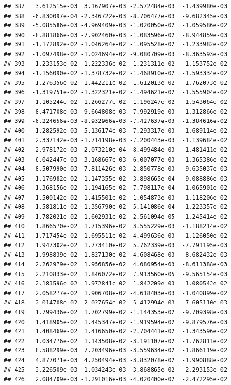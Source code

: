 \documentclass[
]{article}
\begin{document}
\begin{verbatim}
## 387   3.612515e-03  3.167907e-03 -2.572484e-03  -1.439980e-03
## 388  -6.830097e-04 -2.346722e-03 -8.706477e-03  -9.682345e-03
## 389  -5.085586e-03 -4.969409e-03 -1.020050e-02  -1.059586e-02
## 390  -8.881866e-03 -7.902460e-03 -1.083596e-02  -8.944859e-03
## 391  -1.172892e-02 -1.046264e-02 -1.095528e-02  -1.233982e-02
## 392  -1.097498e-02 -1.024694e-02 -9.080709e-03  -8.363593e-03
## 393  -1.233153e-02 -1.222336e-02 -1.231311e-02  -1.153752e-02
## 394  -1.156090e-02 -1.378732e-02 -1.468910e-02  -1.593334e-02
## 395  -1.276356e-02 -1.442211e-02 -1.612013e-02  -1.762073e-02
## 396  -1.319751e-02 -1.322321e-02 -1.494621e-02  -1.555904e-02
## 397  -1.105244e-02 -1.266277e-02 -1.196247e-02  -1.543064e-02
## 398  -8.471708e-03 -9.664808e-03 -7.992919e-03  -1.312866e-02
## 399  -6.224656e-03 -8.932966e-03 -7.427637e-03  -1.384616e-02
## 400  -1.282592e-03 -5.136174e-03 -7.293317e-03  -1.689114e-02
## 401   2.337142e-03 -1.714198e-03 -7.200443e-03  -1.139684e-02
## 402   2.978172e-03 -2.073210e-04 -8.499484e-03  -1.481411e-02
## 403   6.042447e-03  3.168667e-03 -6.007077e-03  -1.365386e-02
## 404   8.507990e-03  7.811426e-03 -2.850778e-03  -9.635037e-03
## 405   1.176982e-02  1.147355e-02  3.898665e-04  -9.088886e-03
## 406   1.368156e-02  1.194165e-02  7.798117e-04  -1.065901e-02
## 407   1.500142e-02  1.415501e-02  1.054873e-03  -1.118206e-02
## 408   1.581811e-02  1.356790e-02 -5.141086e-04  -1.223357e-02
## 409   1.782021e-02  1.602931e-02  2.561094e-05  -1.245414e-02
## 410   1.866570e-02  1.715396e-02  3.555229e-03  -1.188214e-02
## 411   1.717454e-02  1.695511e-02  4.499636e-03  -1.126050e-02
## 412   1.947302e-02  1.773410e-02  5.762339e-03  -7.791195e-03
## 413   1.998839e-02  1.827130e-02  4.608468e-03  -8.682432e-03
## 414   2.262979e-02  1.956856e-02  4.080954e-03  -8.611388e-03
## 415   2.210833e-02  1.846072e-02  7.913560e-05  -9.565154e-03
## 416   2.183596e-02  1.972841e-02 -1.842209e-03  -1.080542e-02
## 417   2.058277e-02  1.906708e-02 -4.618403e-03  -1.040899e-02
## 418   2.014708e-02  2.027654e-02 -5.412994e-03  -7.605110e-03
## 419   1.799436e-02  1.702799e-02 -1.144353e-02  -9.709398e-03
## 420   1.418905e-02  1.445347e-02 -1.919594e-02  -9.879576e-03
## 421   1.408469e-02  1.416650e-02 -2.704441e-02  -1.343596e-02
## 422   1.034776e-02  1.143508e-02 -3.191107e-02  -1.762811e-02
## 423   8.588299e-03  7.203496e-03 -3.559634e-02  -1.866119e-02
## 424   4.877071e-03  4.250494e-03 -3.832078e-02  -1.990888e-02
## 425   3.226509e-03  1.034243e-03 -3.868865e-02  -2.293153e-02
## 426   2.084709e-03 -1.291016e-03 -4.020400e-02  -2.472295e-02

\end{verbatim}
\end{document}
